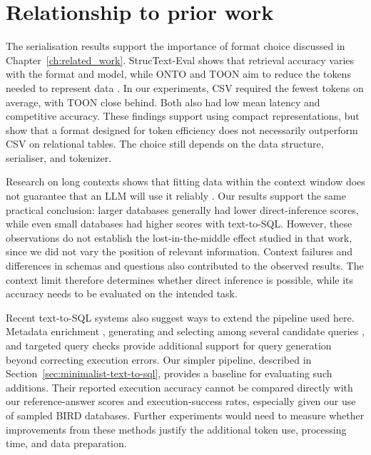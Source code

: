 \section{Relationship to prior work}

The serialisation results support the importance of format choice discussed in Chapter~\ref{ch:related_work}.
StrucText-Eval \cite{struct-text-eval} shows that retrieval accuracy varies with the format and model, while
ONTO and TOON aim to reduce the tokens needed to represent data
\cite{onto-serialization-format,toon-format-2025}. In our experiments, CSV required the fewest tokens on
average, with TOON close behind. Both also had low mean latency and competitive accuracy. These findings
support using compact representations, but show that a format designed for token efficiency does not
necessarily outperform CSV on relational tables. The choice still depends on the data structure, serialiser,
and tokenizer.

Research on long contexts shows that fitting data within the context window does not guarantee that an LLM
will use it reliably \cite{liu2024lost}. Our results support the same practical conclusion: larger databases
generally had lower direct-inference scores, while even small databases had higher scores with text-to-SQL.
However, these observations do not establish the lost-in-the-middle effect studied in that work, since we did
not vary the position of relevant information. Context failures and differences in schemas and questions also
contributed to the observed results. The context limit therefore determines whether direct inference is
possible, while its accuracy needs to be evaluated on the intended task.

Recent text-to-SQL systems also suggest ways to extend the pipeline used here. Metadata enrichment
\cite{shkapenyuk2025metadata}, generating and selecting among several candidate queries
\cite{wang2025agentar}, and targeted query checks \cite{li2026deepeyesql} provide additional support for
query generation beyond correcting execution errors. Our simpler pipeline, described in
Section~\ref{sec:minimalist-text-to-sql}, provides a baseline for evaluating such additions. Their reported
execution accuracy cannot be compared directly with our reference-answer scores and execution-success rates,
especially given our use of sampled BIRD databases. Further experiments would need to measure whether
improvements from these methods justify the additional token use, processing time, and data preparation.


